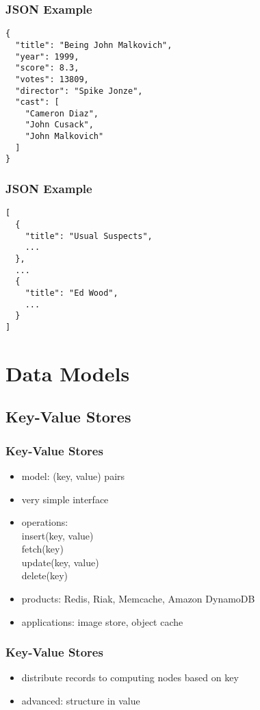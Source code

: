 \documentclass[dvipsnames]{beamer}
\theoremstyle{plain}
\begin{document}
\lstset{language=Python}

\begin{frame}[fragile]
  \frametitle{JSON Example}

  \begin{lstlisting}
{
  "title": "Being John Malkovich",
  "year": 1999,
  "score": 8.3,
  "votes": 13809,
  "director": "Spike Jonze",
  "cast": [
    "Cameron Diaz",
    "John Cusack",
    "John Malkovich"
  ]
}
  \end{lstlisting}
\end{frame}

\begin{frame}[fragile]
  \frametitle{JSON Example}

  \begin{lstlisting}
[
  {
    "title": "Usual Suspects",
    ...
  },
  ...
  {
    "title": "Ed Wood",
    ...
  }
]
  \end{lstlisting}
\end{frame}

\section{Data Models}

\subsection{Key-Value Stores}

\begin{frame}
  \frametitle{Key-Value Stores}

  \begin{itemize}
    \item model: (key, value) pairs
    \item very simple interface
    \item operations:\\
      insert(key, value)\\
      fetch(key)\\
      update(key, value)\\
      delete(key)
    \item products: Redis, Riak, Memcache, Amazon DynamoDB
    \item applications: image store, object cache
  \end{itemize}
\end{frame}

\begin{frame}
  \frametitle{Key-Value Stores}

  \begin{itemize}
    \item distribute records to computing nodes based on key
    \item advanced: structure in value
  \end{itemize}
\end{frame}
\end{document}
